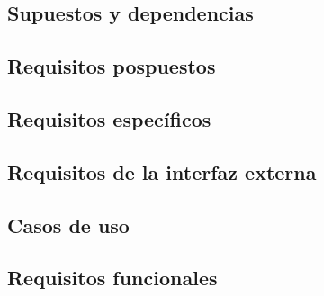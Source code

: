 \subsection{Supuestos y dependencias}


\subsection{Requisitos pospuestos}


\newpage

\subsection{Requisitos específicos}
\label{Requisitos específicos}


\subsection{Requisitos de la interfaz externa}




\subsection{Casos de uso}


\subsection{Requisitos funcionales}

% 
% 

% 

